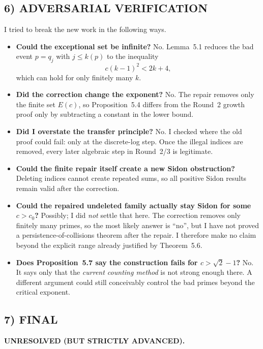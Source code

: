 \subsection*{6) ADVERSARIAL VERIFICATION}
I tried to break the new work in the following ways.

\begin{itemize}
\item \textbf{Could the exceptional set be infinite?}
No. Lemma~5.1 reduces the bad event $p=q_j$ with $j\le k(p)$ to the inequality
\[
c(k-1)^2<2k+4,
\]
which can hold for only finitely many $k$.

\item \textbf{Did the correction change the exponent?}
No. The repair removes only the finite set $E(c)$, so Proposition~5.4 differs from the Round~2 growth proof only by subtracting a constant in the lower bound.

\item \textbf{Did I overstate the transfer principle?}
No. I checked where the old proof could fail: only at the discrete-log step.
Once the illegal indices are removed, every later algebraic step in Round~2/3 is legitimate.

\item \textbf{Could the finite repair itself create a new Sidon obstruction?}
Deleting indices cannot create repeated sums, so all positive Sidon results remain valid after the correction.

\item \textbf{Could the repaired undeleted family actually stay Sidon for some $c>c_0$?}
Possibly; I did \emph{not} settle that here.
The correction removes only finitely many primes, so the most likely answer is ``no'', but I have not proved a persistence-of-collisions theorem after the repair.
I therefore make no claim beyond the explicit range already justified by Theorem~5.6.

\item \textbf{Does Proposition~5.7 say the construction fails for $c>\sqrt2-1$?}
No.
It says only that the \emph{current counting method} is not strong enough there.
A different argument could still conceivably control the bad primes beyond the critical exponent.
\end{itemize}

\subsection*{7) FINAL}
\textbf{UNRESOLVED (BUT STRICTLY ADVANCED).}

